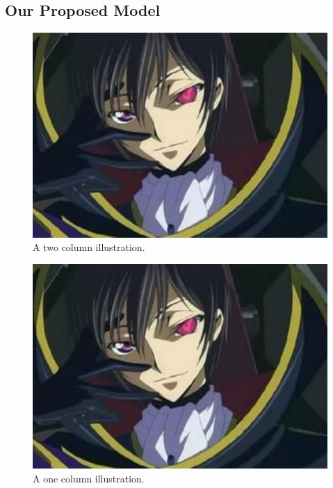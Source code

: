 
\subsection{Our Proposed Model}



\begin{figure}
	\centering
	\includegraphics[width = 18cm]{../fig/model}
	\caption{\small A two column illustration.
  }
	\label{fig:illustration}
\end{figure}

\begin{figure}
	\centering
	\includegraphics[width = \linewidth]{../fig/model}
	\caption{\small A one column illustration.
  }
	\label{fig:illustration}
\end{figure}
